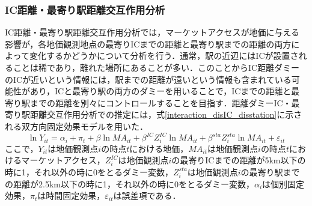 \subsubsection{IC距離・最寄り駅距離交互作用分析}
IC距離・最寄り駅距離交互作用分析では，マーケットアクセスが地価に与える影響が，各地価観測地点の最寄りICまでの距離と最寄り駅までの距離の両方によって変化するかどうかについて分析を行う．通常，駅の近辺にはICが設置されることは稀であり，離れた場所にあることが多い．このことからIC距離ダミーのICが近いという情報には，駅までの距離が遠いという情報も含まれている可能性があり，ICと最寄り駅の両方のダミーを用いることで，ICまでの距離と最寄り駅までの距離を別々にコントロールすることを目指す．距離ダミーIC・最寄り駅距離交互作用分析での推定には，式\ref{interaction_disIC_disstation}に示される双方向固定効果モデルを用いた．
\begin{equation}
  \ln{Y_{it}} = \alpha_{i} + \pi_{t} + \beta\ln{MA_{it}} + \beta^{IC}Z^{IC}_{i}\ln{MA_{it}} + \beta^{sta}Z^{sta}_{i}\ln{MA_{it}} + \varepsilon_{it}
  \label{interaction_disIC_disstation}
\end{equation}
ここで，$Y_{it}$は地価観測点$i$の時点$t$における地価，$MA_{it}$は地価観測点$i$の時点$t$におけるマーケットアクセス，$Z^{IC}_{i}$は地価観測点$i$の最寄りICまでの距離が5km以下の時に1，それ以外の時に0をとるダミー変数，$Z^{sta}_{i}$は地価観測点$i$の最寄り駅までの距離が2.5km以下の時に1，それ以外の時に0をとるダミー変数，$\alpha_{i}$は個別固定効果，$\pi_{t}$は時間固定効果，$\varepsilon_{it}$は誤差項である．

